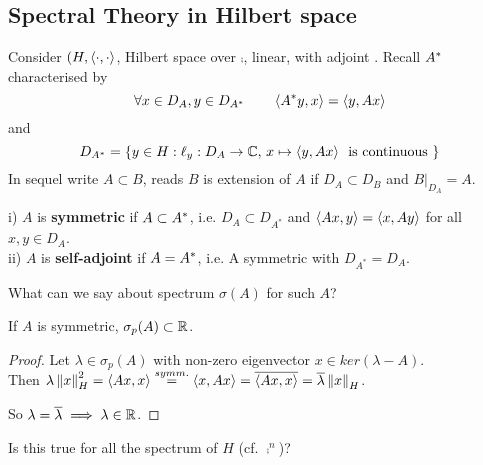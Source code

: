 \documentclass{article}
\begin{document}

\subsection{Spectral Theory in Hilbert space}
Consider $(H,\left<{\cdot},{\cdot}\right>$, Hilbert space over $\comp$,  linear, with adjoint .
Recall ${A}^*$ characterised by $$\forall x\in D_A, y\in D_{A^*} \qquad \left<{{A}^*y},{x}\right>=\left<{y},{Ax}\right>$$ 
and 
$$D_{A^*}=\{y\in H : \ell_y:D_A\to \mathbb{C},\,x\mapsto \left<{y},{Ax}\right>\,\text{ is continuous }\}$$
In sequel write $A\subset B$, reads $B$ is extension of $A$ if $D_A\subset D_B$ and $B|_{D_A}=A$.


\begin{definition}\nl
	i)  $A$ is {\textbf{symmetric}} if $A\subset {A}^*$, i.e. $D_A\subset D_{A^*}$ and $\left<{Ax},{y}\right>=\left<{x},{Ay}\right>$ for all $x,y\in D_A$.\\
	ii) $A$ is {\textbf{self-adjoint}} if $A={A}^*$, i.e. A symmetric with $D_{A^*}=D_A$.
\end{definition}

What can we say about spectrum $\sigma(A)$ for such $A$?

\begin{lemma}
	If $A$ is symmetric, $\sigma_p(A)\subset\mathbb{R}$.

\end{lemma}
	\begin{proof}
		Let $\lambda\in\sigma_p(A)$ with non-zero eigenvector $x\in ker(\lambda-A)$. \\
		Then $\lambda\left\|{x}\right\|_H^2=\left<{Ax},{x}\right>\stackrel{symm.}{=}\left<{x},{Ax}\right>=\overline{\left<{Ax},{x}\right>}=\overline{\lambda}\left\|{x}\right\|_H$.   
  
  So $\lambda=\overline{\lambda}\implies \lambda\in\mathbb{R}$.
	\end{proof}
Is this true for all the spectrum of $  H$ (cf. $\comp^n$)?

\end{document}
